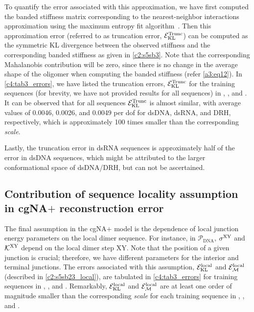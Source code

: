To quantify the error associated with this approximation, we have first computed the banded stiffness matrix corresponding to the nearest-neighbor interactions approximation using the maximum entropy fit algorithm~\cite{glowackithesis}.
Then this approximation error (referred to as truncation error, ${\mathcal E}_{\text{KL}}^{\text{Trunc}}$) can be computed as the symmetric KL divergence between the observed stiffness and the corresponding banded stiffness as given in \cref{c2:s5sb3}.
Note that the corresponding Mahalanobis contribution will be zero, since there is no change in the average shape of the oligomer when computing the banded stiffness (refer \cref{a3:eq12}). In \cref{c4:tab3_errors}, we have listed the truncation errors, ${\mathcal E}_{\text{KL}}^{\text{Trunc}}$ for the training sequences (for brevity, we have not provided results for all sequences) in \Lbdna, \Lbrna, and \Lbdrh.
It can be observed that for all sequences ${\mathcal E}_{\text{KL}}^{\text{Trunc}}$ is almost similar, with average values of 0.0046, 0.0026, and 0.0049 per dof for dsDNA, dsRNA, and DRH, respectively, which is approximately 100 times smaller than the corresponding \textit{scale}.

Lastly, the truncation error in dsRNA sequences is approximately half of the error in dsDNA sequences, which might be attributed to the larger conformational space of dsDNA/DRH, but can not be ascertained.

\subsection{Contribution of sequence locality assumption in cgNA$+$ reconstruction error}\label{c4:s3sb2}
The final assumption in the cgNA$+$ model is the dependence of local junction energy parameters on the local dimer sequence.
For instance, in $\mathcal{P}_{\text{DNA}}$, $\sigma^{{\text{XY}}}$ and ${\mathcal K}^{{\text{XY}}}$ depend on the local dimer step XY. 
Note that the position of a given junction is crucial; therefore, we have different parameters for the interior and terminal junctions.
The errors associated with this assumption, ${\mathcal E}_{\text{KL}}^{\text{local}}$ and ${\mathcal E}_{\mathcal{M}}^{\text{local}}$ (described in \cref{c2:s5sb23_local}), are tabulated in \cref{c4:tab3_errors} for training sequences in \Lbdna, \Lbrna, and \Lbdrh.
Remarkably, ${\mathcal E}_{\text{KL}}^{\text{local}}$ and ${\mathcal E}_{\mathcal{M}}^{\text{local}}$ are at least one order of magnitude smaller than the corresponding \textit{scale} for each training sequence in \Lbdna, \Lbrna, and \Lbdrh.

